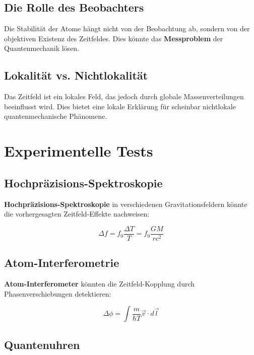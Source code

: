 \documentclass[12pt,a4paper]{report}
\begin{document}
\subsection{Die Rolle des Beobachters}

Die Stabilität der Atome hängt nicht von der Beobachtung ab, sondern von der objektiven Existenz des Zeitfeldes. Dies könnte das \textbf{Messproblem} der Quantenmechanik lösen.

\subsection{Lokalität vs. Nichtlokalität}

Das Zeitfeld ist ein lokales Feld, das jedoch durch globale Massenverteilungen beeinflusst wird. Dies bietet eine lokale Erklärung für scheinbar nichtlokale quantenmechanische Phänomene.

\section{Experimentelle Tests}

\subsection{Hochpräzisions-Spektroskopie}

\textbf{Hochpräzisions-Spektroskopie} in verschiedenen Gravitationsfeldern könnte die vorhergesagten Zeitfeld-Effekte nachweisen:

\begin{equation}
	\Delta f = f_0 \frac{\Delta T}{T} = f_0 \frac{GM}{rc^2}
\end{equation}

\subsection{Atom-Interferometrie}

\textbf{Atom-Interferometer} könnten die Zeitfeld-Kopplung durch Phasenverschiebungen detektieren:

\begin{equation}
	\Delta\phi = \int \frac{m}{\hbar T} \vec{v} \cdot d\vec{l}
\end{equation}

\subsection{Quantenuhren}
\end{document}
